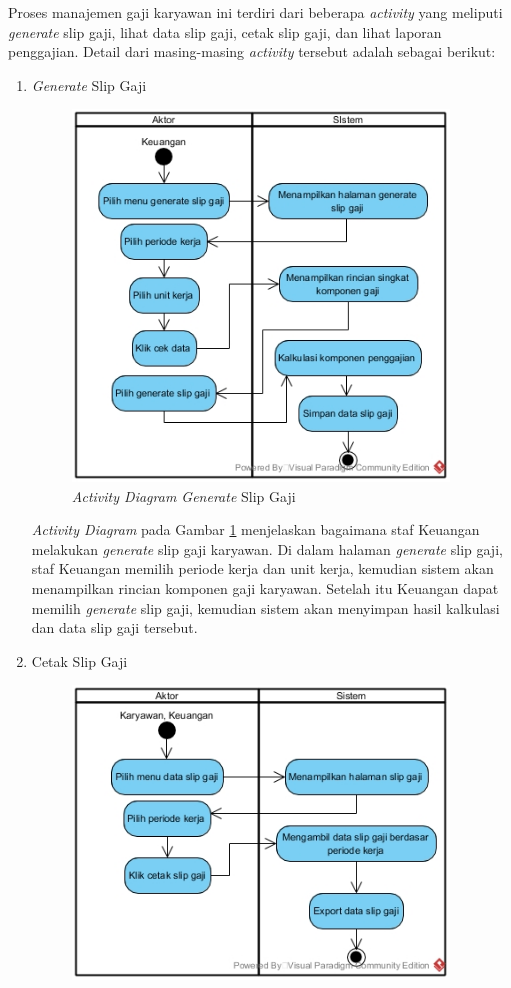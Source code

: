 \begin{enumerate}
            	 Proses manajemen gaji karyawan ini terdiri dari beberapa \emph{activity} yang meliputi \emph{generate} slip gaji, lihat data slip gaji, cetak slip gaji, dan lihat laporan penggajian. Detail dari masing-masing \emph{activity} tersebut adalah sebagai berikut:
                \begin{enumerate}[label=\alph*.]
            	     \itemsep0em
            	     \item \emph{Generate} Slip Gaji
            	     \begin{figure}[H]
            		    \centering
            		    \includegraphics[width=10cm]{gambar/activity/generate-slip-gaji}
            		    \caption{\emph{Activity Diagram Generate} Slip Gaji}
            		    \label{activity_generate_slip}
                    \end{figure}
                    \emph{Activity Diagram} pada Gambar \ref{activity_generate_slip} menjelaskan bagaimana staf Keuangan melakukan \emph{generate} slip gaji karyawan. Di dalam halaman \emph{generate} slip gaji, staf Keuangan memilih periode kerja dan unit kerja, kemudian sistem akan menampilkan rincian komponen gaji karyawan. Setelah itu Keuangan dapat memilih \emph{generate} slip gaji, kemudian sistem akan menyimpan hasil kalkulasi dan data slip gaji tersebut.
            	    \item Cetak Slip Gaji
            	    \begin{figure}[H]
            		    \centering
            		    \includegraphics[width=10cm]{gambar/activity/cetak-slip-gaji}

\end{figure}
\end{enumerate}
\end{enumerate}
